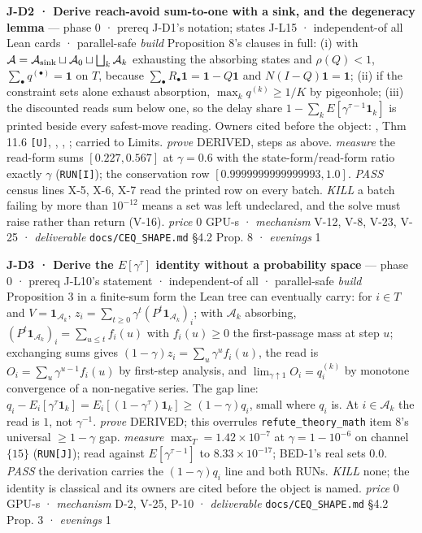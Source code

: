 \documentclass[11pt,a4paper]{article}
\newcounter{none}                 %
\theoremstyle{plain}
\theoremstyle{definition}
\theoremstyle{remark}
\begin{document}
\textbf{J-D2 · Derive reach-avoid sum-to-one with a sink, and the
degeneracy lemma} --- phase 0 · prereq J-D1's notation; states J-L15 ·
independent-of all Lean cards · parallel-safe \emph{build} Proposition
8's clauses in full: (i) with
\(\mathcal{A}=\mathcal{A}_{\rm sink}\sqcup\mathcal{A}_0\sqcup\bigsqcup_k\mathcal{A}_k\)
exhausting the absorbing states and \(\rho(Q)<1\),
\(\sum_\bullet q^{(\bullet)}=\mathbf 1\) on \(T\), because
\(\sum_\bullet R_\bullet\mathbf 1=\mathbf 1-Q\mathbf 1\) and
\(N(I-Q)\mathbf 1=\mathbf 1\); (ii) if the constraint sets alone exhaust
absorption, \(\max_k q^{(k)}\ge1/K\) by pigeonhole; (iii) the discounted
reads sum below one, so the delay share
\(1-\sum_k E[\gamma^{\tau-1}\mathbf 1_k]\) is printed beside every
safest-move reading. Owners cited before the object:
\citep{kemeny-1976-finite}, \citep{grinstead-1997-probability} Thm 11.6
\texttt{{[}U{]}}, \citep{summers-2010-reach-avoid},
\citep{vanmoffaert-2013-chebyshev}, \citep{fisac-2019-bridging};
\citep{misra-2023-safety-constrained-mdp} carried to Limits.
\emph{prove} DERIVED, steps as above. \emph{measure} the read-form sums
\([0.227, 0.567]\) at \(\gamma=0.6\) with the state-form/read-form ratio
exactly \(\gamma\) (\texttt{RUN{[}I{]}}); the conservation row
\([0.9999999999999993, 1.0]\). \emph{PASS} census lines X-5, X-6, X-7
read the printed row on every batch. \emph{KILL} a batch failing by more
than \(10^{-12}\) means a set was left undeclared, and the solve must
raise rather than return (V-16). \emph{price} \(0\) GPU-s ·
\emph{mechanism} V-12, V-8, V-23, V-25 · \emph{deliverable}
\texttt{docs/CEQ\_SHAPE.md} §4.2 Prop. 8 · \emph{evenings} 1

\textbf{J-D3 · Derive the \(E[\gamma^\tau]\) identity without a
probability space} --- phase 0 · prereq J-L10's statement ·
independent-of all · parallel-safe \emph{build} Proposition 3 in a
finite-sum form the Lean tree can eventually carry: for \(i\in T\) and
\(V=\mathbf 1_{\mathcal{A}_k}\),
\(z_i=\sum_{t\ge0}\gamma^t(P^t\mathbf 1_{\mathcal{A}_k})_i\); with
\(\mathcal{A}_k\) absorbing,
\((P^t\mathbf 1_{\mathcal{A}_k})_i=\sum_{u\le t}f_i(u)\) with
\(f_i(u)\ge0\) the first-passage mass at step \(u\); exchanging sums
gives \((1-\gamma)z_i=\sum_u\gamma^u f_i(u)\), the read is
\(O_i=\sum_u\gamma^{u-1}f_i(u)\) by first-step analysis, and
\(\lim_{\gamma\uparrow1}O_i=q^{(k)}_i\) by monotone convergence of a
non-negative series. The gap line:
\(q_i-E_i[\gamma^\tau\mathbf 1_k]=E_i[(1-\gamma^\tau)\mathbf 1_k]\ge(1-\gamma)q_i\),
small where \(q_i\) is. At \(i\in\mathcal{A}_k\) the read is \(1\), not
\(\gamma^{-1}\). \emph{prove} DERIVED; this overrules
\texttt{refute\_theory\_math} item 8's universal \(\ge1-\gamma\) gap.
\emph{measure} \(\max_T=1.42\times10^{-7}\) at \(\gamma=1-10^{-6}\) on
channel \(\{15\}\) (\texttt{RUN{[}J{]}}); read against
\(E[\gamma^{\tau-1}]\) to \(8.33\times10^{-17}\); BED-1's real sets
\(0.0\). \emph{PASS} the derivation carries the \((1-\gamma)q_i\) line
and both RUNs. \emph{KILL} none; the identity is classical and its
owners are cited before the object is named. \emph{price} \(0\) GPU-s ·
\emph{mechanism} D-2, V-25, P-10 · \emph{deliverable}
\texttt{docs/CEQ\_SHAPE.md} §4.2 Prop. 3 · \emph{evenings} 1
\end{document}
